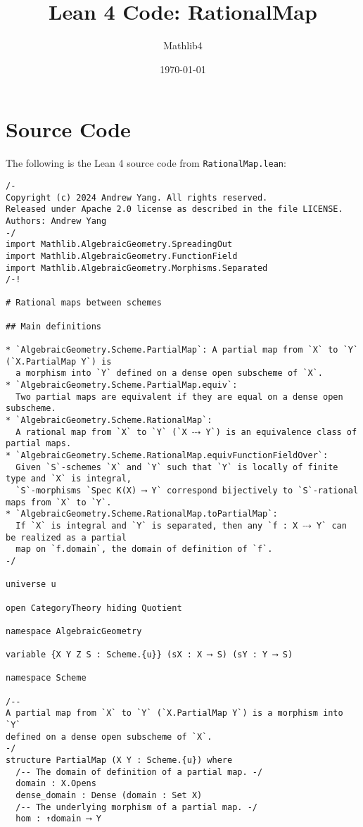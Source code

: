 \documentclass{article}
\title{Lean 4 Code: RationalMap}
\author{Mathlib4}
\date{\today}
\begin{document}
\maketitle

\section{Source Code}

The following is the Lean 4 source code from \texttt{RationalMap.lean}:

\begin{lstlisting}[language=Lean, caption={RationalMap.lean}]
/-
Copyright (c) 2024 Andrew Yang. All rights reserved.
Released under Apache 2.0 license as described in the file LICENSE.
Authors: Andrew Yang
-/
import Mathlib.AlgebraicGeometry.SpreadingOut
import Mathlib.AlgebraicGeometry.FunctionField
import Mathlib.AlgebraicGeometry.Morphisms.Separated
/-!

# Rational maps between schemes

## Main definitions

* `AlgebraicGeometry.Scheme.PartialMap`: A partial map from `X` to `Y` (`X.PartialMap Y`) is
  a morphism into `Y` defined on a dense open subscheme of `X`.
* `AlgebraicGeometry.Scheme.PartialMap.equiv`:
  Two partial maps are equivalent if they are equal on a dense open subscheme.
* `AlgebraicGeometry.Scheme.RationalMap`:
  A rational map from `X` to `Y` (`X ⤏ Y`) is an equivalence class of partial maps.
* `AlgebraicGeometry.Scheme.RationalMap.equivFunctionFieldOver`:
  Given `S`-schemes `X` and `Y` such that `Y` is locally of finite type and `X` is integral,
  `S`-morphisms `Spec K(X) ⟶ Y` correspond bijectively to `S`-rational maps from `X` to `Y`.
* `AlgebraicGeometry.Scheme.RationalMap.toPartialMap`:
  If `X` is integral and `Y` is separated, then any `f : X ⤏ Y` can be realized as a partial
  map on `f.domain`, the domain of definition of `f`.
-/

universe u

open CategoryTheory hiding Quotient

namespace AlgebraicGeometry

variable {X Y Z S : Scheme.{u}} (sX : X ⟶ S) (sY : Y ⟶ S)

namespace Scheme

/--
A partial map from `X` to `Y` (`X.PartialMap Y`) is a morphism into `Y`
defined on a dense open subscheme of `X`.
-/
structure PartialMap (X Y : Scheme.{u}) where
  /-- The domain of definition of a partial map. -/
  domain : X.Opens
  dense_domain : Dense (domain : Set X)
  /-- The underlying morphism of a partial map. -/
  hom : ↑domain ⟶ Y


\end{lstlisting}
\end{document}
